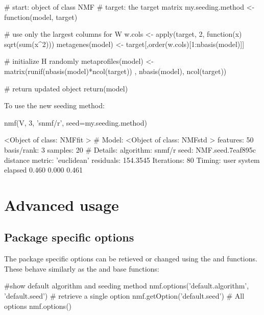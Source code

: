 \documentclass[a4paper]{article}
\begin{document}
\begin{Schunk}
\begin{Sinput}
 # start: object of class NMF
 # target: the target matrix
 my.seeding.method <- function(model, target){
 	
 	# use only the largest columns for W
 	w.cols <- apply(target, 2, function(x) sqrt(sum(x^2)))
 	metagenes(model) <- target[,order(w.cols)[1:nbasis(model)]]
 	
 	# initialize H randomly
 	metaprofiles(model) <- matrix(runif(nbasis(model)*ncol(target))
 						, nbasis(model), ncol(target))
 
 	# return updated object
 	return(model)
 }
\end{Sinput}
\end{Schunk}

To use the new seeding method:
\begin{Schunk}
\begin{Sinput}
 nmf(V, 3, 'snmf/r', seed=my.seeding.method)
\end{Sinput}
\begin{Soutput}
<Object of class: NMFfit >
 # Model:
  <Object of class: NMFstd >
  features: 50 
  basis/rank: 3 
  samples: 20 
 # Details:
  algorithm:  snmf/r 
  seed:  NMF.seed.7eaf895c 
  distance metric:  'euclidean' 
  residuals:  154.3545 
  Iterations: 80 
  Timing:
     user  system elapsed 
    0.460   0.000   0.461 
\end{Soutput}
\end{Schunk}

\section{Advanced usage}

\subsection{Package specific options}
The package specific options can be retieved or changed using the  
and  functions. 
These behave similarly as the  and  
base functions:

\begin{Schunk}
\begin{Sinput}
 #show default algorithm and seeding method
 nmf.options('default.algorithm', 'default.seed')
 # retrieve a single option
 nmf.getOption('default.seed')
 # All options
 nmf.options()
\end{Sinput}
\end{Schunk}
\end{document}
